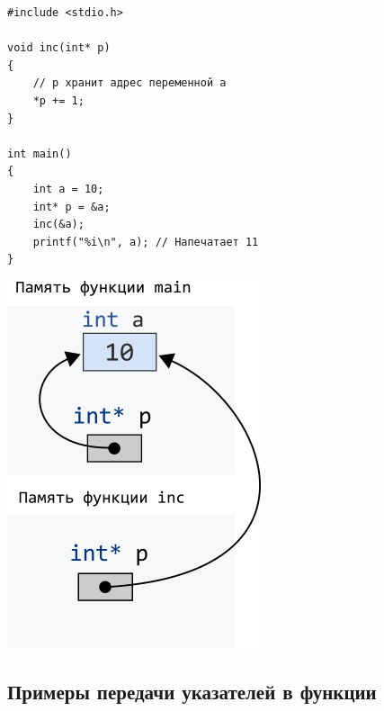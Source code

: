 \documentclass[10pt]{article}
\begin{document}
\begin{multicols}{2}
\noindent
\begin{lstlisting}
#include <stdio.h>

void inc(int* p)
{
    // p хранит адрес переменной a
    *p += 1; 
}

int main()
{
    int a = 10;
    int* p = &a;
    inc(&a);
    printf("%i\n", a); // Напечатает 11
}
\end{lstlisting}

\begin{center}
\includegraphics[scale=0.62]{../images/intpassbypointer.png}
\end{center}
\end{multicols}

\subsection*{Примеры передачи указателей в функции}
\end{document}
